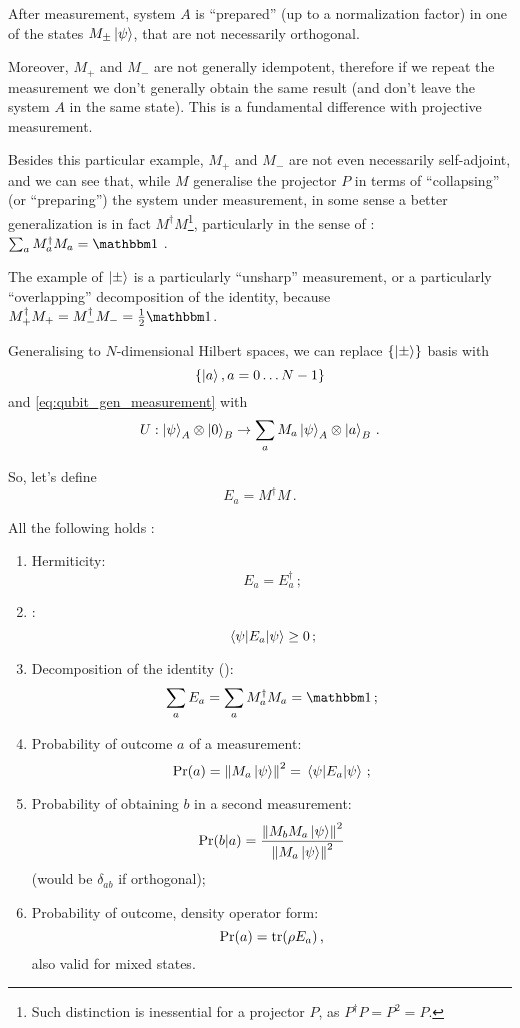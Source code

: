 After measurement, system $A$ is ``prepared''
(up to a normalization factor)
in one of the states $M_{\pm}\ket{\psi}$,
that are not necessarily orthogonal.

Moreover, $M_+$ and $M_-$ are not generally idempotent,
therefore if we repeat the measurement we don't generally
obtain the same result (and don't leave the system $A$ in the same state).
This is a fundamental difference with projective measurement.

Besides this particular example, $M_+$ and $M_-$ are not even necessarily
self-adjoint, and we can see that, while $M$ generalise the projector $P$
in terms of ``collapsing'' (or ``preparing'') the system under measurement,
in some sense a better generalization is in fact $M^{\dagger}M$\footnote{
  Such distinction is inessential for a projector $P$,
  as $P^{\dagger}P = P^2 = P$.
}, particularly in the sense of :
$\sum_a M_a^{\dagger}M_a = \idop$ \parencite[sec.3.1]{PreskillNotes}.

The example of $\ket{\pm}$ is a particularly ``unsharp'' measurement,
or a particularly ``overlapping'' decomposition of the identity,
because $M_+^{\dagger}M_+ = M_-^{\dagger}M_- = \frac{1}{2}\idop$.

Generalising to $N$-dimensional Hilbert spaces, we can replace
$\left\{\ket{\pm}\right\}$ basis with
\[
  \left\{\ket{a}, a = 0\ldots N-1\right\}
\]
and \eqref{eq:qubit_gen_measurement} with
\begin{equation}\label{eq:gen_measurement}
  U: \ket{\psi}_A \otimes \ket{0}_B \rightarrow \sum_a M_a\ket{\psi}_A \otimes \ket{a}_B
  \,\text{.}
\end{equation}

So, let's define
\[
  E_a = M^{\dagger}M \,\text{.}
\]

\citereset
All the following holds \parencite[sec.3.1]{PreskillNotes}:
\begin{enumerate}
  \item 
    Hermiticity: \[E_a = E_a^{\dagger}\,\text{;}\]
  \item
    : \[\expval{E_a}{\psi} \geq 0\,\text{;}\]  
  \item\label{listitem:POVM}
    Decomposition of the identity ():
    \begin{equation}\label{eq:POVM}
      \sum_a E_a = \sum_a M_a^{\dagger}M_a = \idop \,\text{;}
    \end{equation}
  \item
    Probability of outcome $a$ of a measurement:
    \[\Pr(a) = \norm{M_a\ket{\psi}}^2 = \expval{E_a}{\psi}\,\text{;}\]
  \item
    Probability of obtaining $b$ in a second measurement:
    \[\Pr(b|a) = \frac{\norm{M_bM_a\ket{\psi}}^2}{\norm{M_a\ket{\psi}}^2}\]
    (would be $\delta_{ab}$ if orthogonal);
  \item
    Probability of outcome, density operator form:
    \[\Pr(a) = \tr(\rho E_a)\,\text{,}\]
    also valid for mixed states.
\end{enumerate}

